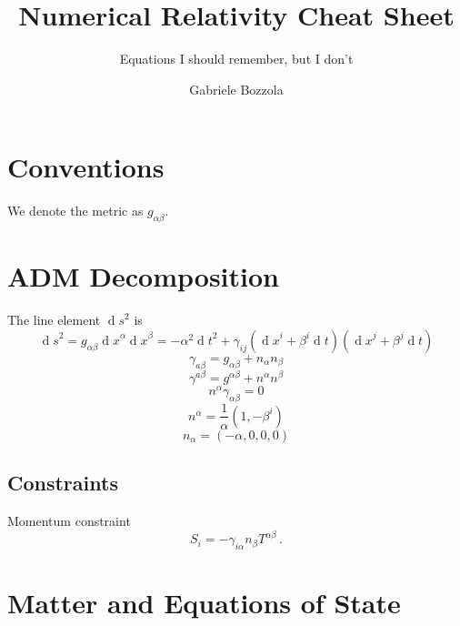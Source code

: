 \documentclass[]{scrartcl}
\author{Gabriele Bozzola}
\title{Numerical Relativity Cheat Sheet}
\date{}
\subtitle{Equations I should remember, but I don't}
\renewcommand{\d}[1]{\ensuremath{\operatorname{d}\!{#1}}}
\begin{document}
\maketitle
\tableofcontents

\section{Conventions}
\label{sec:conventions}

We denote the metric as $g_{\alpha\beta}$.

\section{ADM Decomposition}
\label{sec:adm-decomposition}

The line element $\d s^2$ is
\begin{equation}
  \label{eq:2}
  \d s^2 = g_{\alpha\beta} \d x^\alpha \d x^\beta = - \alpha^2 \d t^2 + \gamma_{ij} (\d x^i + \beta^i \d t) (\d x^j + \beta^j \d t)
\end{equation}
\begin{equation}
  \label{eq:11}
  \gamma_{a\beta} = g_{\alpha\beta} + n_\alpha n_\beta
\end{equation}
\begin{equation}
  \label{eq:11}
  \gamma^{a\beta} = g^{\alpha\beta} + n^\alpha n^\beta
\end{equation}
\begin{equation}
  \label{eq:12}
  n^\alpha \gamma_{\alpha\beta} = 0
\end{equation}
\begin{equation}
  \label{eq:4}
  n^\alpha = \frac{1}{\alpha} (1, - \beta^i)
\end{equation}
\begin{equation}
  \label{eq:5}
  n_\alpha = (-\alpha,0,0,0)
\end{equation}

\subsection{Constraints}
\label{sec:constraints}

Momentum constraint
\begin{equation}
  \label{eq:9}
  S_i = - \gamma_{i\alpha} n_\beta T^{\alpha\beta}\,.
\end{equation}

\section{Matter and Equations of State}
\label{sec:matter}
\end{document}
